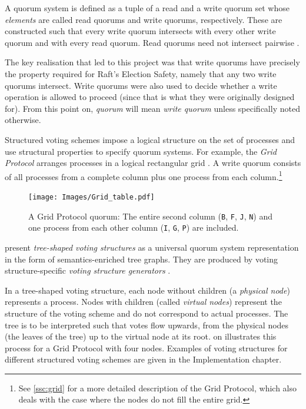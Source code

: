 \documentclass[12pt,chapterprefix=true,toc=bibliography,numbers=noendperiod,
               footnotes=multiple,twoside]{scrreprt}
\begin{document}

A quorum system is defined as a tuple of a read and a write quorum set whose \emph{elements} are called read quorums and write quorums, respectively. These are constructed such that every write quorum intersects with every other write quorum and with every read quorum. Read quorums need not intersect pairwise \autocite[For a formal definition of \emph{quorum}, \emph{quorum set} and \emph{quorum system}, see][section 2.3]{voting}.

The key realisation that led to this project was that write quorums have precisely the property required for Raft's Election Safety, namely that any two write quorums intersect. Write quorums were also used to decide whether a write operation is allowed to proceed (since that is what they were originally designed for). From this point on, \emph{quorum} will mean \emph{write quorum} unless specifically noted otherwise.

\label{voting-example}

Structured voting schemes impose a logical structure on the set of processes and use structural properties to specify quorum systems. For example, the \emph{Grid Protocol} arranges processes in a logical rectangular grid \autocite{grid}. A write quorum consists of all processes from a complete column plus one process from each column.\footnote{See \cref{ssc:grid} for a more detailed description of the Grid Protocol, which also deals with the case where the nodes do not fill the entire grid.}

\begin{figure}[h]
    \centering
    \texttt{[image: Images/Grid\_table.pdf]}
    \caption[Grid Protocol quorum table]{A Grid Protocol quorum: The entire second column (\texttt{B}, \texttt{F}, \texttt{J}, \texttt{N}) and one process from each other column (\texttt{I}, \texttt{G}, \texttt{P}) are included.}
    \label{fig:grid-quorum}
\end{figure}


\citeauthor{generators} present \emph{tree-shaped voting structures} as a universal quorum system representation in the form of semantics-enriched tree graphs. They are produced by voting structure-specific \emph{voting structure generators} \autocite{generators}.

In a tree-shaped voting structure, each node without children (a \emph{physical node}) represents a process. Nodes with children (called \emph{virtual nodes}) represent the structure of the voting scheme and do not correspond to actual processes. The tree is to be interpreted such that votes flow upwards, from the physical nodes (the leaves of the tree) up to the virtual node at its root.  on  illustrates this process for a Grid Protocol with four nodes. Examples of voting structures for different structured voting schemes are given in the Implementation chapter.
\end{document}
